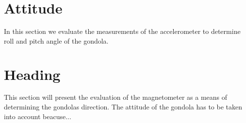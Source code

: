 \section{Attitude \label{sec:res:attitude}}
In this section we evaluate the measurements of the accelerometer to determine roll and pitch angle of the gondola.

\section{Heading \label{sec:res:heading}}
This section will present the evaluation of the magnetometer as a means of determining the gondolas direction. The attitude of the gondola has to be taken into account beacuse...